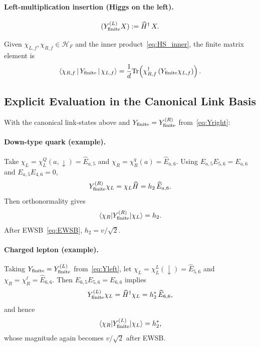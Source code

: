 \paragraph{Left-multiplication insertion (Higgs on the left).}
\begin{equation}
(Y^{(L)}_{\rm finite} X) := \widehat{H}^\dagger\,X.
\label{eq:Yleft}
\end{equation}

Given $\chi_{L,f}, \chi_{R,f} \in \mathcal{H}_F$ and the inner product~\eqref{eq:HS_inner}, 
the finite matrix element is
\begin{equation}
\langle \chi_{R,f}\,|\,Y_{\rm finite}\,|\,\chi_{L,f}\rangle
= \frac{1}{d}\mathrm{Tr}\!\left(\chi_{R,f}^\dagger\,(Y_{\rm finite}\chi_{L,f})\right).
\label{eq:matrix_element}
\end{equation}

\subsection{Explicit Evaluation in the Canonical Link Basis}

With the canonical link-states above and $Y_{\rm finite} = Y^{(R)}_{\rm finite}$ 
from~\eqref{eq:Yright}:

\paragraph{Down-type quark (example).}
Take $\chi_{L} = \chi^{Q}_{L}(a,\downarrow) = \widehat{E}_{a,5}$ and 
$\chi_{R} = \chi^{q}_{R}(a) = \widehat{E}_{a,6}$.
Using $E_{a,5}E_{5,6} = E_{a,6}$ and $E_{a,5}E_{4,6} = 0$,
\begin{equation}
Y^{(R)}_{\rm finite}\chi_L = \chi_L\widehat{H} = h_2\,\widehat{E}_{a,6}.
\end{equation}
Then orthonormality gives
\begin{equation}
\langle \chi_R | Y^{(R)}_{\rm finite} | \chi_L \rangle = h_2.
\end{equation}
After EWSB~\eqref{eq:EWSB}, $h_2 = v/\sqrt{2}$.

\paragraph{Charged lepton (example).}
Taking $Y_{\rm finite} = Y^{(L)}_{\rm finite}$ from~\eqref{eq:Yleft},
let $\chi_L = \chi^{L}_{L}(\downarrow) = \widehat{E}_{5,6}$ and 
$\chi_R = \chi^{\ell}_{R} = \widehat{E}_{6,6}$.
Then $E_{6,5}E_{5,6} = E_{6,6}$ implies
\begin{equation}
Y^{(L)}_{\rm finite}\chi_L = \widehat{H}^\dagger\chi_L = h_2^*\,\widehat{E}_{6,6},
\end{equation}
and hence
\begin{equation}
\langle \chi_R | Y^{(L)}_{\rm finite} | \chi_L \rangle = h_2^*,
\end{equation}
whose magnitude again becomes $v/\sqrt{2}$ after EWSB.

